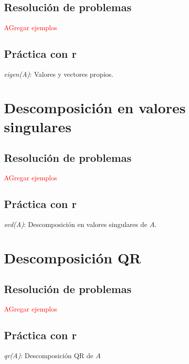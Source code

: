 \subsection{Resolución de problemas}

\textcolor{red}{AGregar ejemplos}

\subsection{Práctica con r}

\textit{eigen(A)}: Valores y vectores propios.


\section{Descomposición en valores singulares}

\subsection{Resolución de problemas}

\textcolor{red}{AGregar ejemplos}

\subsection{Práctica con r}

\textit{svd(A)}: Descomposición en valores singulares de $A$.


\section{Descomposición QR}

  
\subsection{Resolución de problemas}

\textcolor{red}{AGregar ejemplos}

\subsection{Práctica con r}

\textit{qr(A)}: Descomposición QR de $A$

